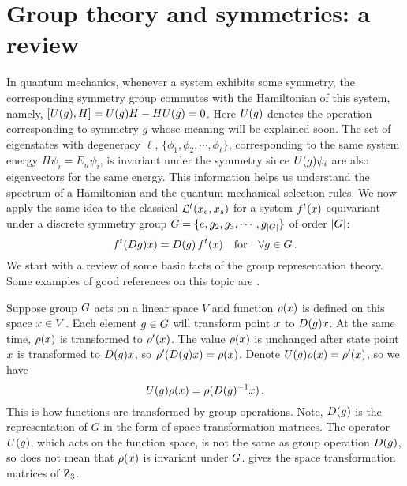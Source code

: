 
\section{Group theory and symmetries: a review}
\label{sect:group}

In quantum mechanics, whenever a system exhibits some symmetry, the
corresponding symmetry group commutes with the Hamiltonian of this
system, namely, $[U(g), H] = U(g)H - HU(g) = 0$. Here
$U(g)$ denotes the operation corresponding to symmetry $g$ whose
meaning will be explained soon. The set of eigenstates with degeneracy
$\ell$, $\{\phi_1, \phi_2, \cdots, \phi_\ell\}$, corresponding to the same
system energy $H\psi_i = E_n\psi_i$, is invariant under the symmetry
since $U(g)\psi_i$ are also eigenvectors for the same energy.
This information helps us understand the spectrum of a Hamiltonian and
the quantum mechanical selection rules. We now apply the same idea to
the classical {\evOper} $\mathcal{L}^t(x_e, x_s)$
for a system ${f^{t}(x)}$ equivariant under a discrete symmetry group
$G=\{e, g_2, g_3,\cdots, g_{|G|}\}$ of order
$|G|$:
\begin{equation}
  \label{eq:equiva}
  {f^{t}({D}\ensuremath{g})}x)={D}(g)\,{f^{t}(x)} \quad \text{for}
  \quad \forall
  g\in G
  \,.
\end{equation}
We start with a review of some basic facts of
the group representation theory. Some examples of good references
on this topic are .

Suppose group $G$ acts on a linear space $V$ and function
$\rho(x)$ is defined on this space $x\in V$. Each element
$g\in G$ will transform point $x$ to ${D}(g)x$. At
the same time, $\rho(x)$ is transformed to $\rho'(x)$. The value
$\rho(x)$ is unchanged after state point $x$ is transformed to
${D}(g)x$, so $\rho'({D}(g)x) = \rho(x)$. Denote
$U(g)\rho(x)=\rho'(x)$, so we have
\begin{equation}
  \label{eq:ogfx}
  U(g)\rho(x) = \rho({D}(g)^{-1}x)
  \,.
\end{equation}
This is how functions are transformed by group operations. Note, $D(g)$
is the representation of $G$ in the form of space transformation matrices.
The
operator $U(g)$, which acts on the function space, is not the same as
group operation ${D}(g)$, so  does not mean that
$\rho(x)$ is invariant under $G$.  gives
the space transformation matrices of $\textrm{Z}_{3}$.

